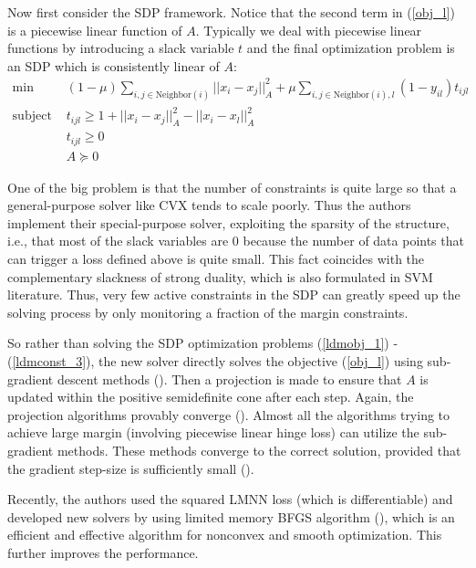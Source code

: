 \documentclass[12pt]{article}
\newcommand{\st}{\text{subject to }}
\begin{document}
Now first consider the SDP framework. Notice that the second term in (\ref{obj_l}) is a piecewise linear function of $A$. Typically we deal with piecewise linear functions by introducing a slack variable $t$ and the final optimization problem is an SDP which is consistently linear of $A$:
\begin{align}
\min\ &(1-\mu)\sum_{i,j\in\text{Neighbor}(i)}||x_i-x_j||_A^2 + \mu\sum_{i,j\in\text{Neighbor}(i),l}(1-y_{il})t_{ijl} \label{ldmobj_1}\\
\st & t_{ijl} \geq 1+||x_i-x_j||_A^2-||x_i-x_l||_A^2 \\
& t_{ijl} \geq 0 \\
& A\succeq 0 \label{ldmconst_3}
\end{align}

One of the big problem is that the number of constraints is quite large so that a general-purpose solver like CVX tends to scale poorly. Thus the authors implement their special-purpose solver, exploiting the sparsity of the structure, i.e., that most of the slack variables are 0 because the number of data points that can trigger a loss defined above is quite small. This fact coincides with the complementary slackness of strong duality, which is also formulated  in SVM literature. Thus, very few active constraints in the SDP can greatly speed up the solving process by only monitoring a fraction of the margin constraints. 

So rather than solving the SDP optimization problems (\ref{ldmobj_1}) - (\ref{ldmconst_3}), the new solver directly solves the objective (\ref{obj_l}) using sub-gradient descent methods (\cite{boyd2003subgradient}). Then a projection is made to ensure that $A$ is updated within the positive semidefinite cone after each step. Again, the projection algorithms provably converge (\citet{vandenberghe1996semidefinite}). Almost all the algorithms trying to achieve large margin (involving piecewise linear hinge loss) can utilize the sub-gradient methods. These methods converge to the correct solution, provided that the gradient step-size is sufficiently small (\cite{boyd2003subgradient}).

Recently, the authors used the squared LMNN loss (which is differentiable) and developed new solvers by using limited memory BFGS algorithm (\cite{liu1989limited}), which is an efficient and effective algorithm for nonconvex and smooth optimization. This further improves the performance.
\end{document}
